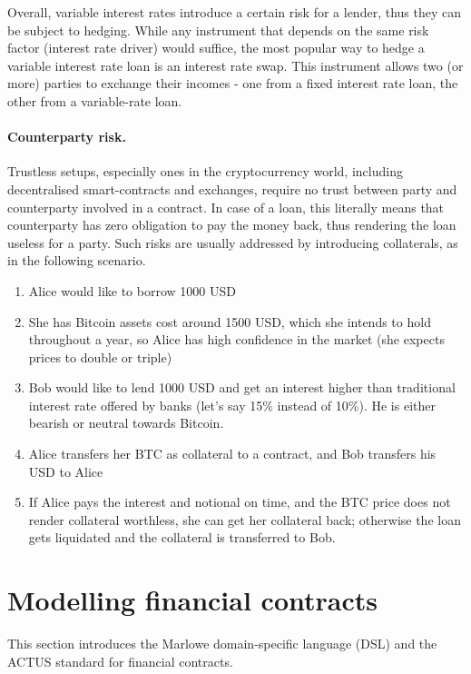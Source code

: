 \documentclass[runningheads]{llncs}
\begin{document}
Overall, variable interest rates introduce a certain risk for a lender,
thus they can be %
subject to hedging. While any instrument that depends
on the same risk factor (interest rate driver) would suffice, the
most popular way to hedge a variable interest rate loan is an interest
rate swap. This instrument allows two (or more) parties to exchange
their incomes - one from a fixed interest rate loan, the other from a variable-rate loan.

\paragraph*{Counterparty risk.}

Trustless setups, especially ones in the cryptocurrency world, including 
decentralised smart-contracts and exchanges, require no trust between
party and counterparty involved in a contract. In case of a loan,
this literally means that counterparty has zero obligation to pay
the money back, thus rendering the loan useless for a party. Such
risks are usually addressed by introducing collaterals, as in the following scenario. 
\begin{enumerate}
\item Alice would like to borrow 1000 USD 
\item She has Bitcoin assets cost around 1500 USD, which she intends to
hold throughout a year, so Alice has high confidence in the market
(she expects prices to double or triple) 
\item Bob would like to lend 1000 USD and get an interest higher than traditional
interest rate offered by banks (let's say 15\% instead of 10\%). He
is either bearish or neutral towards Bitcoin. 
\item Alice transfers her BTC as collateral to a contract, and Bob transfers
his USD to Alice 
\item If Alice pays the interest and notional on time, and the BTC price does not
render collateral worthless, she can get her collateral back; otherwise
the loan gets liquidated and the collateral is transferred to Bob. 
\end{enumerate}

\section{Modelling financial contracts}
\label{modelling}

This section introduces the Marlowe domain-specific language (DSL) and the ACTUS standard for financial contracts.
\end{document}
